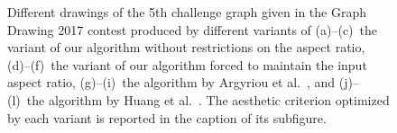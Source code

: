 \documentclass{comjnl}
\begin{document}
\begin{figure}[h!]
	\caption{Different drawings of the 5th challenge graph given in the Graph Drawing 2017 contest produced by different variants of
	(a)--(c)~the variant of our algorithm without restrictions on the aspect ratio, 
	(d)--(f)~the variant of our algorithm forced to maintain the input aspect ratio,
	(g)--(i)~the algorithm by Argyriou et al.~\cite{DBLP:journals/cj/ArgyriouBS13}, and
	(j)--(l)~the algorithm by Huang et al.~\cite{DBLP:journals/vlc/HuangEHL13}.
	The aesthetic criterion optimized by each variant is reported in the caption of its subfigure.}
	\label{fig:graph5}
\end{figure}

\begin{figure}[htbp]
	\centering
	\hfill
	\hfill
	\hfill	

\end{figure}
\end{document}

